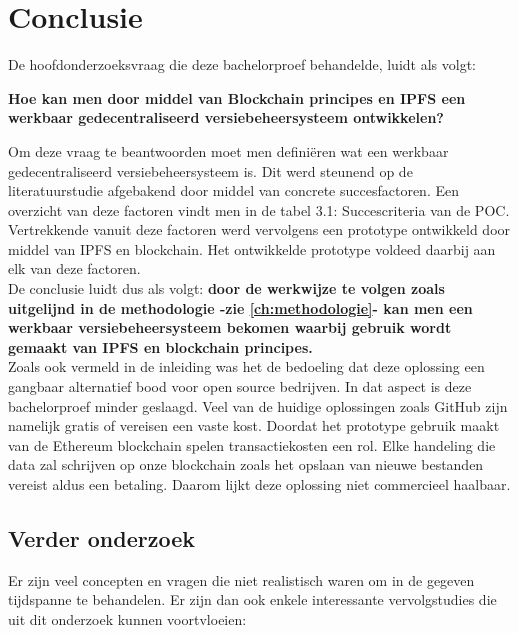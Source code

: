 
\chapter{Conclusie}
\label{ch:conclusie}
De hoofdonderzoeksvraag die deze bachelorproef behandelde, luidt als volgt: 

\textbf{Hoe kan men door middel van Blockchain principes en IPFS een werkbaar gedecentraliseerd versiebeheersysteem ontwikkelen?}

Om deze vraag te beantwoorden moet men definiëren wat een werkbaar gedecentraliseerd versiebeheersysteem is. Dit werd steunend op de literatuurstudie afgebakend door middel van concrete succesfactoren. Een overzicht van deze factoren vindt men in de tabel 3.1: Succescriteria van de POC. Vertrekkende vanuit deze factoren werd vervolgens een prototype ontwikkeld door middel van IPFS en blockchain. Het ontwikkelde prototype voldeed daarbij aan elk van deze factoren.\\ 

De conclusie luidt dus als volgt: \textbf{door de werkwijze te volgen zoals uitgelijnd in de methodologie -zie \ref{ch:methodologie}- kan men een werkbaar versiebeheersysteem bekomen waarbij gebruik wordt gemaakt van IPFS en blockchain principes.}\\

Zoals ook vermeld in de inleiding was het de bedoeling dat deze oplossing een gangbaar alternatief bood voor open source bedrijven. In dat aspect is deze bachelorproef minder geslaagd. Veel van de huidige oplossingen zoals GitHub zijn namelijk gratis of vereisen een vaste kost. Doordat het prototype gebruik maakt van de Ethereum blockchain spelen transactiekosten een rol. Elke handeling die data zal schrijven op onze blockchain zoals het opslaan van nieuwe bestanden vereist aldus een betaling. Daarom lijkt deze oplossing niet commercieel haalbaar.\\

\section{Verder onderzoek}
Er zijn veel concepten en vragen die niet realistisch waren om in de gegeven tijdspanne te behandelen. Er zijn dan ook enkele interessante vervolgstudies die uit dit onderzoek kunnen voortvloeien:

